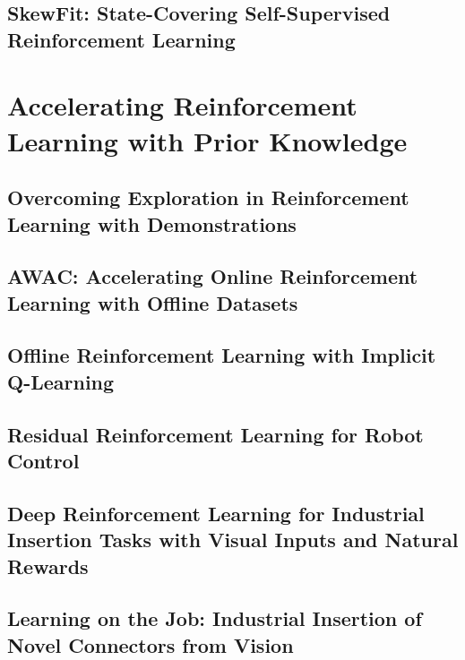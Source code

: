 \documentclass[ titlepage,numbers=noenddot,headinclude,
                footinclude=true,cleardoublepage=empty,abstractoff,
                BCOR=5mm,paper=letter,fontsize=12pt,
                american,
                openany
                ]{scrreprt}
\begin{document}
\chapter{SkewFit: State-Covering Self-Supervised Reinforcement Learning}\label{chapter:skewfit}

\part{Accelerating Reinforcement Learning with Prior Knowledge}

\chapter{Overcoming Exploration in Reinforcement Learning with Demonstrations}\label{chapter:bcddpg}

\chapter{AWAC: Accelerating Online Reinforcement Learning with Offline Datasets}\label{chapter:awac}

\chapter{Offline Reinforcement Learning with Implicit Q-Learning}\label{chapter:iql}

\chapter{Residual Reinforcement Learning for Robot Control}\label{chapter:residualrl}

\chapter{Deep Reinforcement Learning for Industrial Insertion Tasks with Visual Inputs and Natural Rewards}\label{chapter:insertion}

\chapter{Learning on the Job: Industrial Insertion of Novel Connectors from Vision}\label{chapter:daib}
\end{document}
